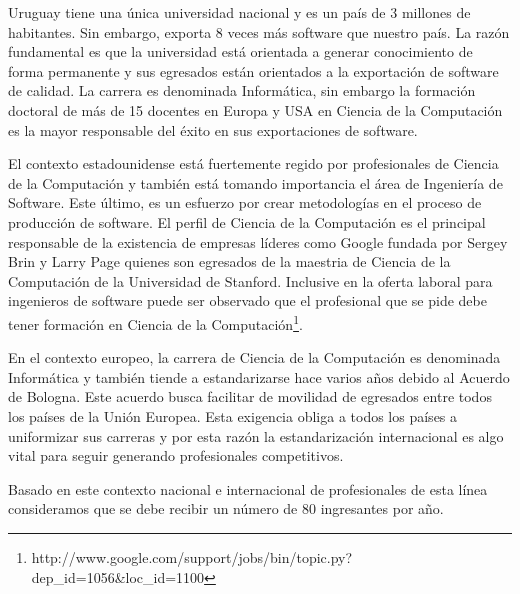 Uruguay tiene una única universidad nacional y es un país de 3 millones de habitantes. Sin embargo, exporta 8 veces más software que nuestro país. La razón fundamental es que la universidad está orientada a generar conocimiento de forma permanente y sus egresados están orientados a la exportación de software de calidad. La carrera es denominada Informática, sin embargo la formación doctoral de más de 15 docentes en Europa y USA en Ciencia de la Computación es la mayor responsable del éxito en sus exportaciones de software.

El contexto estadounidense está fuertemente regido por profesionales de Ciencia de la Computación y también está tomando importancia el área de Ingeniería de Software. Este último, es un esfuerzo por crear metodologías en el proceso de producción de software. El perfil de Ciencia de la Computación es el principal responsable de la existencia de empresas líderes como Google fundada por Sergey Brin y Larry Page quienes son egresados de la maestria de Ciencia de la Computación de la Universidad de Stanford. Inclusive en la oferta laboral para ingenieros de software puede ser observado que el profesional que se pide debe tener formación en Ciencia de la Computación\footnote{http://www.google.com/support/jobs/bin/topic.py?dep\_id=1056\&loc\_id=1100}.

En el contexto europeo, la carrera de Ciencia de la Computación es denominada Informática y también tiende a estandarizarse hace varios años debido al Acuerdo de Bologna. Este acuerdo busca facilitar de movilidad de egresados entre todos los países de la Unión Europea. Esta exigencia obliga a todos los países a uniformizar sus carreras y por esta razón la estandarización internacional es algo vital para seguir generando profesionales competitivos.

Basado en este contexto nacional e internacional de profesionales de esta línea consideramos que se debe recibir un número de 80 ingresantes por año.
